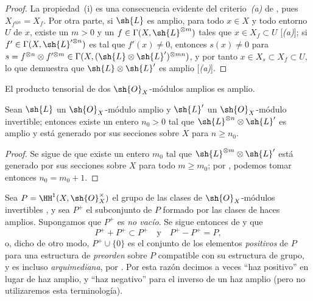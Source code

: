 \documentclass[oneside,10pt]{amsart}
\renewcommand{\geq}{\geqslant}
\let\EGAOriginalLabel\label
\renewcommand{\label}[1]{\phantomsection\EGAOriginalLabel{#1}}
\begin{document}
\begin{proof}
La propiedad~(i) es una consecuencia evidente del criterio~\emph{(a)} de , pues $X_{f^{\otimes n}}=X_f$.
Por otra parte, si $\sh{L}$ es amplio, para todo $x\in X$ y todo entorno $U$ de $x$, existe un $m>0$ y un $f\in\Gamma(X,\sh{L}^{\otimes m})$ tales que $x\in X_f\subset U$ [\emph{(a)}];
si $f'\in\Gamma(X,\sh{L}'^{\otimes n})$ es tal que $f'(x)\neq0$, entonces $s(x)\neq0$ para $s=f^{\otimes n}\otimes f'^{\otimes m}\in\Gamma(X,(\sh{L}\otimes\sh{L}')^{\otimes mn})$, y por tanto $x\in X_s\subset X_f\subset U$, lo que demuestra que $\sh{L}\otimes\sh{L}'$ es amplio [\emph{(a)}].
\end{proof}

\begin{corollary}[4.5.7]
\label{II.4.5.7}
El producto tensorial de dos $\sh{O}_X$-módulos amplios es amplio.
\end{corollary}

\begin{corollary}[4.5.8]
\label{II.4.5.8}
Sean $\sh{L}$ un $\sh{O}_X$-módulo amplio y $\sh{L}'$ un $\sh{O}_X$-módulo invertible;
entonces existe un entero $n_0>0$ tal que $\sh{L}^{\otimes n}\otimes\sh{L}'$ es amplio y está generado por sus secciones sobre $X$ para $n\geq n_0$.
\end{corollary}

\begin{proof}
Se sigue de  que existe un entero $m_0$ tal que $\sh{L}^{\otimes m}\otimes\sh{L}'$ está generado por sus secciones sobre $X$ para todo $m\geq m_0$;
por , podemos tomar entonces $n_0=m_0+1$.
\end{proof}

\begin{remark}[4.5.9]
\label{II.4.5.9}
Sea $P=\HH^1(X,\sh{O}_X^\times)$ el grupo de las clases de $\sh{O}_X$-módulos invertibles , y sea $P^+$ el subconjunto de $P$ formado por las clases de haces amplios.
Supongamos que $P^+$ es \emph{no vacío}.
Se sigue entonces de  y  que
\[
  P^+ + P^+ \subset P^+
  \quad\text{y}\quad
  P^+ - P^+ = P,
\]
o, dicho de otro modo, $P^+\cup\{0\}$ es el conjunto de los elementos \emph{positivos} de $P$ para una estructura de \emph{preorden} sobre $P$ compatible con su estructura de grupo, y es incluso \emph{arquimediana}, por .
Por esta razón decimos a veces ``haz positivo'' en lugar de haz amplio, y ``haz negativo'' para el inverso de un haz amplio (pero no utilizaremos esta terminología).
\end{remark}
\end{document}
